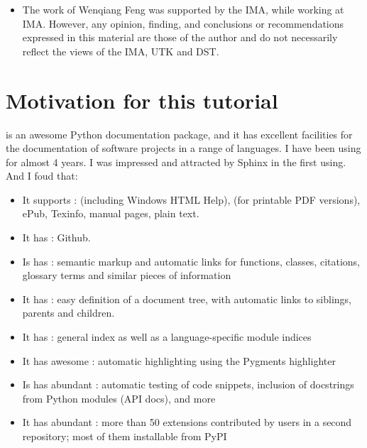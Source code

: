 \documentclass[letterpaper,12pt,english]{sphinxmanual}
\begin{document}
\begin{itemize}
\item {} 

The work of Wenqiang Feng was supported by the IMA, while working at IMA. However, any opinion, finding, and conclusions or recommendations expressed in this material are those of the author and do not necessarily reflect the views of the IMA, UTK and DST.

\end{itemize}


\section{Motivation for this tutorial}
\label{\detokenize{preface:motivation-for-this-tutorial}}
 is an awesome Python documentation package, and it has excellent facilities for the documentation of software projects in a range of languages. I have been using  for almost 4 years. I was impressed and attracted by Sphinx in the first using. And I foud that:
\begin{itemize}
\item {} 
It supports :  (including Windows HTML Help),  (for printable PDF versions), ePub, Texinfo, manual pages, plain text.

\item {} 
It has : Github.

\item {} 
Is has : semantic markup and automatic links for functions, classes, citations, glossary terms and similar pieces of information

\item {} 
It has : easy definition of a document tree, with automatic links to siblings, parents and children.

\item {} 
It has : general index as well as a language-specific module indices

\item {} 
It has awesome : automatic highlighting using the Pygments highlighter

\item {} 
Is has abundant : automatic testing of code snippets, inclusion of docstrings from Python modules (API docs), and more

\item {} 
It has abundant : more than 50 extensions contributed by users in a second repository; most of them installable from PyPI

\end{itemize}
\end{document}
